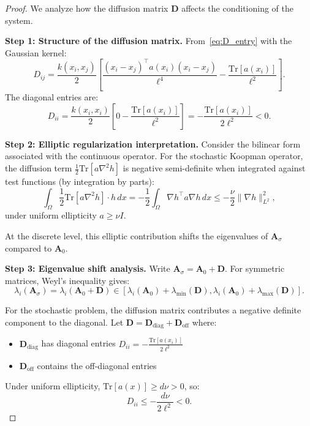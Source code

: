\documentclass[11pt,a4paper]{article}
\newcommand{\Tr}{\mathrm{Tr}}
\newcommand{\bA}{\mathbf{A}}
\newcommand{\bD}{\mathbf{D}}
\begin{document}
\begin{proof}
We analyze how the diffusion matrix $\bD$ affects the conditioning of the system.

\textbf{Step 1: Structure of the diffusion matrix.}
From~\eqref{eq:D_entry} with the Gaussian kernel:
\begin{equation}
D_{ij} = \frac{k(x_i, x_j)}{2}\left[\frac{(x_i - x_j)^\top a(x_i)(x_i - x_j)}{\ell^4} - \frac{\Tr[a(x_i)]}{\ell^2}\right].
\end{equation}
The diagonal entries are:
\begin{equation}
D_{ii} = \frac{k(x_i, x_i)}{2}\left[0 - \frac{\Tr[a(x_i)]}{\ell^2}\right] = -\frac{\Tr[a(x_i)]}{2\ell^2} < 0.
\end{equation}

\textbf{Step 2: Elliptic regularization interpretation.}
Consider the bilinear form associated with the continuous operator. For the stochastic Koopman operator, the diffusion term $\frac{1}{2}\Tr[a\nabla^2 h]$ is negative semi-definite when integrated against test functions (by integration by parts):
\begin{equation}
\int_\Omega \frac{1}{2}\Tr[a\nabla^2 h] \cdot h \, dx = -\frac{1}{2}\int_\Omega \nabla h^\top a \nabla h \, dx \leq -\frac{\nu}{2}\|\nabla h\|_{L^2}^2,
\end{equation}
under uniform ellipticity $a \geq \nu I$.

At the discrete level, this elliptic contribution shifts the eigenvalues of $\bA_\sigma$ compared to $\bA_0$.

\textbf{Step 3: Eigenvalue shift analysis.}
Write $\bA_\sigma = \bA_0 + \bD$. For symmetric matrices, Weyl's inequality gives:
\begin{equation}
\lambda_i(\bA_\sigma) = \lambda_i(\bA_0 + \bD) \in [\lambda_i(\bA_0) + \lambda_{\min}(\bD), \lambda_i(\bA_0) + \lambda_{\max}(\bD)].
\end{equation}

For the stochastic problem, the diffusion matrix contributes a negative definite component to the diagonal. Let $\bD = \bD_{\mathrm{diag}} + \bD_{\mathrm{off}}$ where:
\begin{itemize}
\item $\bD_{\mathrm{diag}}$ has diagonal entries $D_{ii} = -\frac{\Tr[a(x_i)]}{2\ell^2}$
\item $\bD_{\mathrm{off}}$ contains the off-diagonal entries
\end{itemize}

Under uniform ellipticity, $\Tr[a(x)] \geq d\nu > 0$, so:
\begin{equation}
D_{ii} \leq -\frac{d\nu}{2\ell^2} < 0.
\end{equation}


\end{proof}
\end{document}
